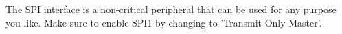 The SPI interface is a non-critical peripheral that can be used for any purpose you like. Make sure to enable SPI1 by changing to 'Transmit Only Master'.